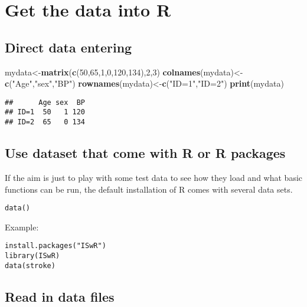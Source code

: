 \documentclass[]{book}
\newenvironment{Shaded}{\begin{snugshade}}{\end{snugshade}}
\newcommand{\KeywordTok}[1]{\textcolor[rgb]{0.13,0.29,0.53}{\textbf{#1}}}
\newcommand{\DecValTok}[1]{\textcolor[rgb]{0.00,0.00,0.81}{#1}}
\newcommand{\StringTok}[1]{\textcolor[rgb]{0.31,0.60,0.02}{#1}}
\newcommand{\NormalTok}[1]{#1}
\theoremstyle{definition}
\theoremstyle{definition}
\theoremstyle{definition}
\theoremstyle{remark}
\begin{document}
\section{Get the data into R}\label{get-the-data-into-r}

\subsection{Direct data entering}\label{direct-data-entering}

\begin{Shaded}
\begin{Highlighting}[]
\NormalTok{mydata<-}\KeywordTok{matrix}\NormalTok{(}\KeywordTok{c}\NormalTok{(}\DecValTok{50}\NormalTok{,}\DecValTok{65}\NormalTok{,}\DecValTok{1}\NormalTok{,}\DecValTok{0}\NormalTok{,}\DecValTok{120}\NormalTok{,}\DecValTok{134}\NormalTok{),}\DecValTok{2}\NormalTok{,}\DecValTok{3}\NormalTok{)}
\KeywordTok{colnames}\NormalTok{(mydata)<-}\KeywordTok{c}\NormalTok{(}\StringTok{"Age"}\NormalTok{,}\StringTok{"sex"}\NormalTok{,}\StringTok{"BP"}\NormalTok{)}
\KeywordTok{rownames}\NormalTok{(mydata)<-}\KeywordTok{c}\NormalTok{(}\StringTok{"ID=1"}\NormalTok{,}\StringTok{"ID=2"}\NormalTok{)}
\KeywordTok{print}\NormalTok{(mydata)}
\end{Highlighting}
\end{Shaded}

\begin{verbatim}
##      Age sex  BP
## ID=1  50   1 120
## ID=2  65   0 134
\end{verbatim}

\subsection{Use dataset that come with R or R
packages}\label{use-dataset-that-come-with-r-or-r-packages}

If the aim is just to play with some test data to see how they load and
what basic functions can be run, the default installation of R comes
with several data sets.

\begin{verbatim}
data()
\end{verbatim}

Example:

\begin{verbatim}
install.packages("ISwR")
library(ISwR)
data(stroke)
\end{verbatim}

\subsection{Read in data files}\label{read-in-data-files}
\end{document}
